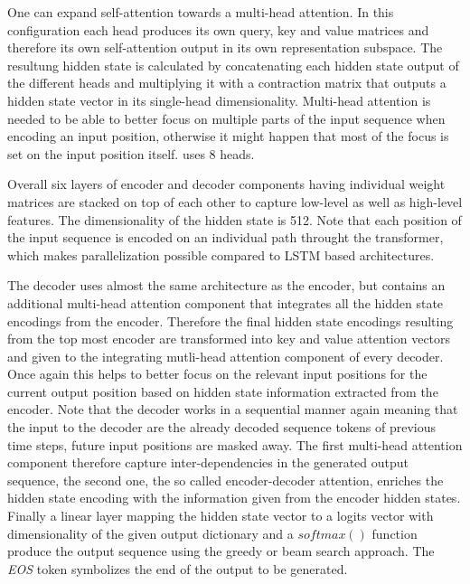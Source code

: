 One can expand self-attention towards a multi-head attention. In this configuration each head produces its own query, key and value matrices and therefore its own self-attention output in its own representation subspace. The resultung hidden state is calculated by concatenating each hidden state output of the different heads and multiplying it with a contraction matrix that outputs a hidden state vector in its single-head dimensionality. Multi-head attention is needed to be able to better focus on multiple parts of the input sequence when encoding an input position, otherwise it might happen that most of the focus is set on the input position itself. \cite{Vaswani2017} uses 8 heads. \cite{Alammar2018, Vaswani2017}

Overall six layers of encoder and decoder components having individual weight matrices are stacked on top of each other to capture low-level as well as high-level features. The dimensionality of the hidden state is 512. Note that each position of the input sequence is encoded on an individual path throught the transformer, which makes parallelization possible compared to \ac{LSTM} based architectures. \cite{Alammar2018, Vaswani2017}

The decoder uses almost the same architecture as the encoder, but contains an additional multi-head attention component that integrates all the hidden state encodings from the encoder. Therefore the final hidden state encodings resulting from the top most encoder are transformed into key and value attention vectors and given to the integrating mutli-head attention component of every decoder. Once again this helps to better focus on the relevant input positions for the current output position based on hidden state information extracted from the encoder. Note that the decoder works in a sequential manner again meaning that the input to the decoder are the already decoded sequence tokens of previous time steps, future input positions are masked away. The first multi-head attention component therefore capture inter-dependencies in the generated output sequence, the second one, the so called encoder-decoder attention, enriches the hidden state encoding with the information given from the encoder hidden states. Finally a linear layer mapping the hidden state vector to a logits vector with dimensionality of the given output dictionary and a $softmax()$ function produce the output sequence using the greedy or beam search approach. The \textit{EOS} token symbolizes the end of the output to be generated. \cite{Alammar2018, Vaswani2017}

